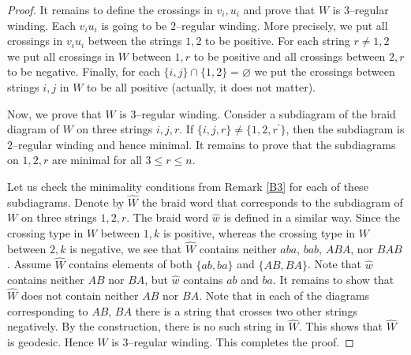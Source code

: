 \documentclass[11pt]{amsart}
\theoremstyle{plain}
\theoremstyle{definition}
\numberwithin{equation}{section}
\begin{document}
\begin{proof}
It remains to define the crossings in $v_i, u_i$ and prove that $W$ is $3$--regular winding. Each $v_iu_i$ is going to be $2$--regular winding. More precisely, we put all crossings in $v_iu_i$ between the strings $1,2$ to be positive. For each string $r \neq 1,2$ we put all crossings in $W$ between $1,r$ to be positive and all crossings between $2,r$ to be negative. Finally, for each $\{i,j\} \cap \{1,2\} = \varnothing$ we put the crossings between strings $i,j$ in $W$ to be all positive (actually, it does not matter). 

Now, we prove that $W$ is $3$--regular winding. Consider a subdiagram of the braid diagram of $W$ on three strings $i,j,r$. If $\{i,j,r\} \neq \{1,2,r^\prime\}$, then the subdiagram is $2$--regular winding and hence minimal. It remains to prove that the subdiagrams on $1,2,r$ are minimal for all $3 \leq r \leq n$. 

Let us check the minimality conditions from Remark \ref{B3} for each of these subdiagrams. Denote by $\hat{W}$ the braid word that corresponds to the subdiagram of $W$ on three strings $1,2,r$. The braid word $\hat{w}$ is defined in a similar way. Since the crossing type in $W$ between $1,k$ is positive, whereas the crossing type in $W$ between $2,k$ is negative, we see that $\hat{W}$ contains neither $aba$, $bab$, $ABA$, nor $BAB$. Assume $\hat{W}$ contains elements of both $\{ab,ba\}$ and $\{AB,BA\}$. Note that $\hat{w}$ contains neither $AB$ nor $BA$, but $\hat{w}$ contains $ab$ and $ba$. It remains to show that $\hat{W}$ does not contain neither $AB$ nor $BA$. Note that in each of the diagrams corresponding to $AB$, $BA$ there is a string that crosses two other strings negatively.
By the construction, there is no such string in $\hat{W}$. This shows that $\hat{W}$ is geodesic. Hence $W$ is $3$--regular winding. This completes the proof.
\end{proof}
\end{document}
